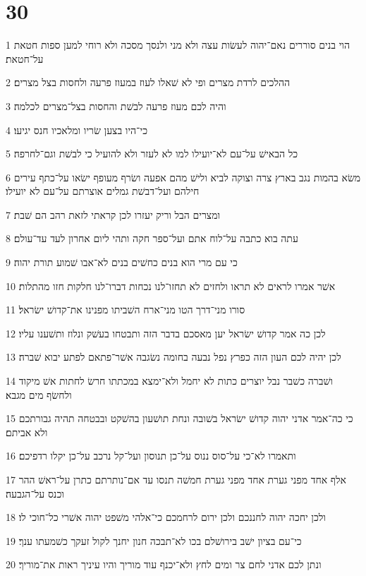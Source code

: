 \chapter{30}

\par 1 הוי בנים סוררים נאם־יהוה לעשׂות עצה ולא מני ולנסך מסכה ולא רוחי למען ספות חטאת על־חטאת׃
\par 2 ההלכים לרדת מצרים ופי לא שׁאלו לעוז במעוז פרעה ולחסות בצל מצרים׃
\par 3 והיה לכם מעוז פרעה לבשׁת והחסות בצל־מצרים לכלמה׃
\par 4 כי־היו בצען שׂריו ומלאכיו חנס יגיעו׃
\par 5 כל הבאישׁ על־עם לא־יועילו למו לא לעזר ולא להועיל כי לבשׁת וגם־לחרפה׃
\par 6 משׂא בהמות נגב בארץ צרה וצוקה לביא ולישׁ מהם אפעה ושׂרף מעופף ישׂאו על־כתף עירים חילהם ועל־דבשׁת גמלים אוצרתם על־עם לא יועילו׃
\par 7 ומצרים הבל וריק יעזרו לכן קראתי לזאת רהב הם שׁבת׃
\par 8 עתה בוא כתבה על־לוח אתם ועל־ספר חקה ותהי ליום אחרון לעד עד־עולם׃
\par 9 כי עם מרי הוא בנים כחשׁים בנים לא־אבו שׁמוע תורת יהוה׃
\par 10 אשׁר אמרו לראים לא תראו ולחזים לא תחזו־לנו נכחות דברו־לנו חלקות חזו מהתלות׃
\par 11 סורו מני־דרך הטו מני־ארח השׁביתו מפנינו את־קדושׁ ישׂראל׃
\par 12 לכן כה אמר קדושׁ ישׂראל יען מאסכם בדבר הזה ותבטחו בעשׁק ונלוז ותשׁענו עליו׃
\par 13 לכן יהיה לכם העון הזה כפרץ נפל נבעה בחומה נשׂגבה אשׁר־פתאם לפתע יבוא שׁברה׃
\par 14 ושׁברה כשׁבר נבל יוצרים כתות לא יחמל ולא־ימצא במכתתו חרשׂ לחתות אשׁ מיקוד ולחשׂף מים מגבא׃
\par 15 כי כה־אמר אדני יהוה קדושׁ ישׂראל בשׁובה ונחת תושׁעון בהשׁקט ובבטחה תהיה גבורתכם ולא אביתם׃
\par 16 ותאמרו לא־כי על־סוס ננוס על־כן תנוסון ועל־קל נרכב על־כן יקלו רדפיכם׃
\par 17 אלף אחד מפני גערת אחד מפני גערת חמשׁה תנסו עד אם־נותרתם כתרן על־ראשׁ ההר וכנס על־הגבעה׃
\par 18 ולכן יחכה יהוה לחננכם ולכן ירום לרחמכם כי־אלהי משׁפט יהוה אשׁרי כל־חוכי לו׃
\par 19 כי־עם בציון ישׁב בירושׁלם בכו לא־תבכה חנון יחנך לקול זעקך כשׁמעתו ענך׃
\par 20 ונתן לכם אדני לחם צר ומים לחץ ולא־יכנף עוד מוריך והיו עיניך ראות את־מוריך׃
